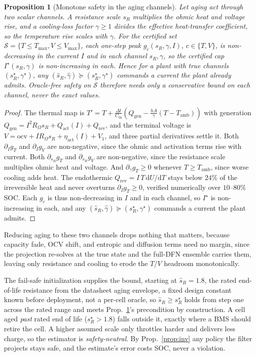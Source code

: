 \documentclass[conference]{IEEEtran}
\newtheorem{proposition}{Proposition}
\begin{document}
\begin{proposition}[Monotone safety in the aging channels]\label{prop:mono}
Let aging act through two scalar channels. A resistance scale $s_R$ multiplies the ohmic heat
and voltage rise, and a cooling-loss factor $\gamma\ge1$ divides the effective heat-transfer
coefficient, so the temperature rise scales with $\gamma$. For the certified set
$\mathcal S=\{T\le T_{\max},V\le V_{\max}\}$, each one-step peak $g_c(s_R,\gamma,I)$,
$c\in\{T,V\}$, is non-decreasing in the current $I$ and in \emph{each} channel $s_R,\gamma$, so
the certified cap $I^\star(s_R,\gamma)$ is non-increasing in each. Hence for a plant with true
channels $(s_R^\star,\gamma^\star)$, any $(\hat s_R,\hat\gamma)\succeq(s_R^\star,\gamma^\star)$
commands a current the plant already admits. Oracle-free safety on $\mathcal S$ therefore needs
only a conservative \emph{bound on each channel}, never the exact values.
\end{proposition}
\begin{proof}
The thermal map is $T'{=}T{+}\tfrac{\Delta t}{C_\mathrm{th}}(Q_\mathrm{gen}{-}\tfrac{hA}{\gamma}(T{-}T_\mathrm{amb}))$
with generation $Q_\mathrm{gen}{=}I^2R_\Omega s_R{+}Q_\mathrm{act}(I){+}Q_\mathrm{rev}$, and the terminal
voltage is $V{=}\mathrm{ocv}{+}IR_\Omega s_R{+}\eta_\mathrm{act}(I){+}V_1$, and three partial derivatives settle it.
Both $\partial_I g_T$ and $\partial_I g_V$ are non-negative, since the ohmic and activation terms rise
with current. Both $\partial_{s_R}g_T$ and $\partial_{s_R}g_V$ are non-negative, since the resistance
scale multiplies ohmic heat and voltage. And $\partial_\gamma g_T\ge0$ whenever $T\ge T_\mathrm{amb}$,
since worse cooling adds heat. The endothermic $Q_\mathrm{rev}{=}I\,T\,\mathrm dU/\mathrm dT$ stays below
$24\%$ of the irreversible heat and never overturns $\partial_I g_T\ge0$, verified numerically over $10$--$80\%$
SOC. Each $g_c$ is thus non-decreasing in $I$ and in each channel, so $I^\star$ is non-increasing in each,
and any $(\hat s_R,\hat\gamma)\succeq(s_R^\star,\gamma^\star)$ commands a current the plant admits.
\end{proof}
Reducing aging to these two channels drops nothing that matters, because capacity fade, OCV shift,
and entropic and diffusion terms need no margin, since the projection re-solves at the true state and the full-DFN ensemble
carries them, leaving only resistance and cooling to erode the $T$/$V$ headroom monotonically.

The fail-safe initialization supplies the bound, starting at $\hat s_R{=}1.8$, the rated
end-of-life resistance from the datasheet aging envelope, a fixed design constant known before
deployment, not a per-cell oracle, so $\hat s_R\ge s_R^\star$ holds from step one across the
rated range and meets Prop.~\ref{prop:mono}'s precondition by construction. A cell aged \emph{past}
rated end of life ($s_R^\star>1.8$) falls outside it, exactly where a BMS should retire the cell. A
higher assumed scale only throttles harder and delivers less charge, so the estimator is
\emph{safety-neutral}. By Prop.~\ref{prop:inv} any policy the filter projects stays safe, and the
estimate's error costs SOC, never a violation.
\end{document}
